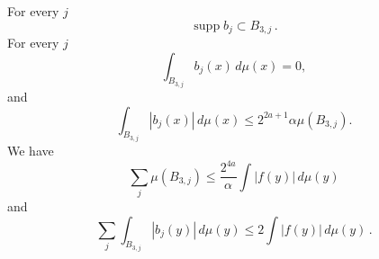 \begin{lemma}
\begin{equation}
    \end{equation}
    For every $j$
    \begin{equation}
        \label{eq-supp-bj}
        \operatorname{supp} b_j \subset B_{3,j}\,.
    \end{equation}
    For every $j$
    \begin{equation}
        \label{eq-bad-mean-zero}
        \int_{B_{3,j}} b_j(x)\, d\mu(x)=0,
    \end{equation}
    and
     \begin{equation}
        \label{eq-bj-L1}
        \int_{B_{3,j}} |b_j(x)|\, d\mu(x) \leq 2^{2a+1} \alpha \mu(B_{3,j}).
    \end{equation}
    We have
    \begin{equation}
        \label{eq-bset-length-sum}
        \sum_j \mu(B_{3,j})\leq \frac{2^{4a}}{\alpha}\int |f(y)|\, d\mu(y)
    \end{equation}
    and
    \begin{equation}
    \label{eq-b-L1}
    \sum_{j}\int_{B_{3,j}} |b_j(y)|\, d\mu(y)\leq 2 \int |f(y)|\, d\mu(y)\,.
    \end{equation}
\end{lemma}

